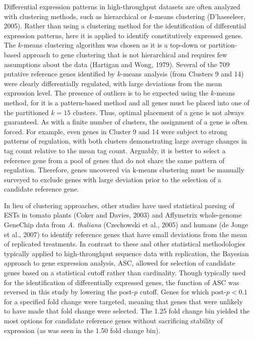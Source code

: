 	Differential expression patterns in high-throughput datasets are often analyzed with clustering methods, such as hierarchical or $k$-means clustering (D’haeseleer, 2005). Rather than using a clustering method for the identification of differential expression patterns, here it is applied to identify constitutively expressed genes. The $k$-means clustering algorithm was chosen as it is a top-down or partition-based approach to gene clustering that is not hierarchical and requires few assumptions about the data (Hartigan and Wong, 1979). Several of the 709 putative reference genes identified by $k$-means analysis (from Clusters 9 and 14) were clearly differentially regulated, with large deviations from the mean expression level. The presence of outliers is to be expected using the $k$-means method, for it is a pattern-based method and all genes must be placed into one of the partitioned $k = 15$ clusters. Thus, optimal placement of a gene is not always guaranteed. As with a finite number of clusters, the assignment of a gene is often forced. For example, even genes in Cluster 9 and 14 were subject to strong patterns of regulation, with both clusters demonstrating large average changes in tag count relative to the mean tag count. Arguably, it is better to select a reference gene from a pool of genes that do not share the same pattern of regulation. Therefore, genes uncovered via k-means clustering must be manually surveyed to exclude genes with large deviation prior to the selection of a candidate reference gene.\par
	In lieu of clustering approaches, other studies have used statistical parsing of ESTs in tomato plants (Coker and Davies, 2003) and Affymetrix whole-genome GeneChip data from \textit{A. thaliana} (Czechowski et al., 2005) and humans (de Jonge et al., 2007) to identify reference genes that have small deviations from the mean of replicated treatments. In contrast to these and other statistical methodologies typically applied to high-throughput sequence data with replication, the Bayesian approach to gene expression analysis, ASC, allowed for selection of candidate genes based on a statistical cutoff rather than cardinality. Though typically used for the identification of differentially expressed genes, the function of ASC was reversed in this study by lowering the post-$p$ cutoff. Genes for which post-$p < 0.1$ for a specified fold change were targeted, meaning that genes that were unlikely to have made that fold change were selected. The 1.25 fold change bin yielded the most options for candidate reference genes without sacrificing stability of expression (as was seen in the 1.50 fold change bin). \par
